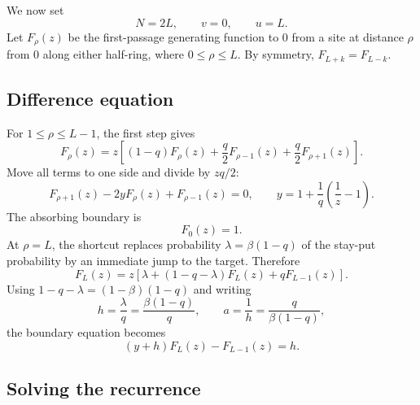 \documentclass[11pt]{article}
\begin{document}
We now set
\begin{equation}
  N=2L,
  \qquad v=0,
  \qquad u=L.
\end{equation}
Let $F_\rho(z)$ be the first-passage generating function to $0$ from a site at distance
$\rho$ from $0$ along either half-ring, where $0\leq\rho\leq L$.  By symmetry,
$F_{L+k}=F_{L-k}$.

\subsection{Difference equation}

For $1\leq\rho\leq L-1$, the first step gives
\begin{equation}
  F_\rho(z)=z\left[(1-q)F_\rho(z)+\frac q2F_{\rho-1}(z)+\frac q2F_{\rho+1}(z)\right].
\end{equation}
Move all terms to one side and divide by $zq/2$:
\begin{equation}
  F_{\rho+1}(z)-2yF_\rho(z)+F_{\rho-1}(z)=0,
  \qquad
  y=1+\frac1q\left(\frac1z-1\right).
  \label{eq:interior-recurrence}
\end{equation}
The absorbing boundary is
\begin{equation}
  F_0(z)=1.
\end{equation}
At $\rho=L$, the shortcut replaces probability $\lambda=\beta(1-q)$ of the stay-put probability by
an immediate jump to the target.  Therefore
\begin{equation}
  F_L(z)=z\left[\lambda+(1-q-\lambda)F_L(z)+qF_{L-1}(z)\right].
\end{equation}
Using $1-q-\lambda=(1-\beta)(1-q)$ and writing
\begin{equation}
  h=\frac{\lambda}{q}=\frac{\beta(1-q)}{q},
  \qquad a=\frac1h=\frac{q}{\beta(1-q)},
\end{equation}
the boundary equation becomes
\begin{equation}
  \boxed{(y+h)F_L(z)-F_{L-1}(z)=h.}
  \label{eq:L-boundary}
\end{equation}

\subsection{Solving the recurrence}
\end{document}
